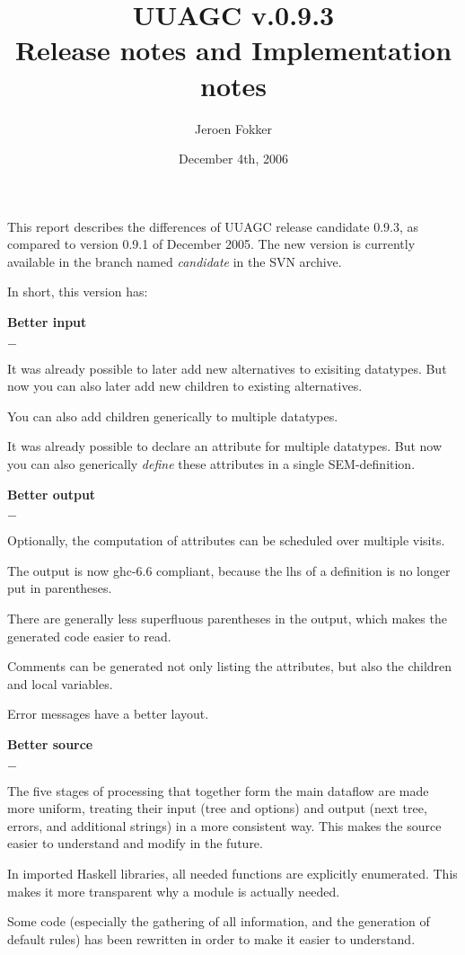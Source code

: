 \documentclass[twoside]{article}
\newenvironment{subitize}{\begin{list}{$-$}{\parsep=0pt\parskip=0pt\topsep=0pt\itemsep=0pt}}{\end{list}}
\begin{document}


\title{UUAGC v.0.9.3\\Release notes and Implementation notes}
\author{Jeroen Fokker}
\date{December 4th, 2006}
\maketitle

This report describes the differences of UUAGC release candidate 0.9.3,
as compared to version 0.9.1 of December 2005.
The new version is currently available in the branch named {\em candidate} in the SVN archive.

In short, this version has:
\begin{itemize}
\item {\bf Better input}
	\begin{subitize}
	\item It was already possible to later add new alternatives to exisiting datatypes.
	      But now you can also later add new children to existing alternatives.
	\item You can also add children generically to multiple datatypes.
	\item It was already possible to declare an attribute for multiple datatypes.
	      But now you can also generically {\em define} these attributes in a single SEM-definition.
	\end{subitize}	      
\item {\bf Better output}
	\begin{subitize}
	\item Optionally, the computation of attributes can be scheduled over multiple visits.
	\item The output is now ghc-6.6 compliant, because the lhs of a definition is no longer put in parentheses.
	\item There are generally less superfluous parentheses in the output,
	      which makes the generated code easier to read.
	\item Comments can be generated not only listing the attributes, but also the children and local variables.
	\item Error messages have a better layout.
	\end{subitize}
\item {\bf Better source}
	\begin{subitize}
	\item The five stages of processing that together form the main dataflow are made more uniform,
	      treating their input (tree and options) and output (next tree, errors, and additional strings)
	      in a more consistent way. This makes the source easier to understand and modify in the future.
	\item In imported Haskell libraries, all needed functions are explicitly enumerated.
	      This makes it more transparent why a module is actually needed.
	\item Some code (especially the gathering of all information, and the generation of default rules)
	      has been rewritten in order to make it easier to understand.
    \end{subitize}
\end{itemize}
\end{document}
